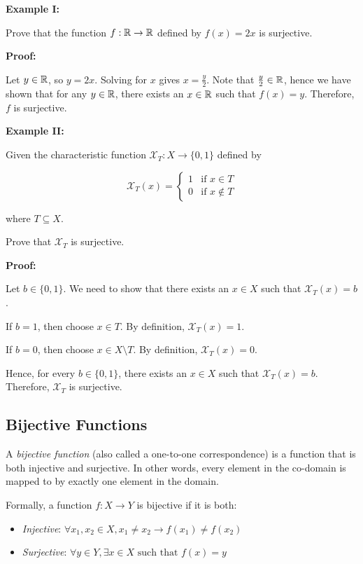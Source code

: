 \textbf{Example I:}

Prove that the function \(f: \mathbb{R} \to \mathbb{R}\) defined by \(f(x) = 2x\) is surjective.

\textbf{Proof:}

Let \(y \in \mathbb{R}\), so \(y = 2x\). Solving for \(x\) gives \(x = \frac{y}{2}\). Note that \(\frac{y}{2} \in \mathbb{R}\), hence
we have shown that for any \(y \in \mathbb{R}\), there exists an \(x \in \mathbb{R}\) such that \(f(x) = y\). Therefore, \(f\) is surjective.

\QED

\textbf{Example II:}

Given the characteristic function \(\mathcal{X}_T: X \to \{0,1\}\) defined by

\[
	\mathcal{X}_T(x) =
	\begin{cases}
		1 & \text{if } x \in T    \\
		0 & \text{if } x \notin T
	\end{cases}
\]

where \(T \subseteq X\).

Prove that \(\mathcal{X}_T\) is surjective.

\textbf{Proof:}

Let \(b \in \{0,1\}\). We need to show that there exists an \(x \in X\) such that \(\mathcal{X}_T(x) = b\).

If \(b = 1\), then choose \(x \in T\). By definition, \(\mathcal{X}_T(x) = 1\).

If \(b = 0\), then choose \(x \in X \setminus T\). By definition, \(\mathcal{X}_T(x) = 0\).

Hence, for every \(b \in \{0,1\}\), there exists an \(x \in X\) such that \(\mathcal{X}_T(x) = b\). Therefore, \(\mathcal{X}_T\) is surjective.

\QED

\subsection{Bijective Functions}

A \emph{bijective function} (also called a one-to-one correspondence) is a function that is both injective and surjective. In other words, every
element in the co-domain is mapped to by exactly one element in the domain.

Formally, a function \(f: X \to Y\) is bijective if it is both:

\begin{itemize}

	\item \emph{Injective}: \(\forall x_1, x_2 \in X, x_1 \neq x_2 \to f(x_1) \neq f(x_2)\)

	\item \emph{Surjective}: \(\forall y \in Y, \exists x \in X \text{ such that } f(x) = y\)

\end{itemize}

